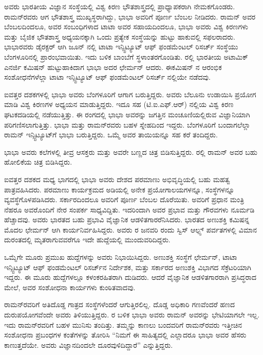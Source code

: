 ಅವರು ಭಾರತೀಯ ವಿಜ್ಞಾನ ಸಂಸ್ಥೆಯಲ್ಲಿ ವಿಶ್ವ ಕಿರಣ ಭೌತಶಾಸ್ತ್ರದಲ್ಲಿ ಪ್ರಾಧ್ಯಾಪಕರಾಗಿ ನೇಮಕಗೊಂಡರು. ರಾಮನ್‍ರವರು ಆಗ ಭೌತಶಾಸ್ತ್ರ ಮುಖ್ಯಸ್ಥರಾಗಿದ್ದು, ಭಾಭಾ ಅವರಿಗೆ ಪೂರ್ಣ ಬೆಂಬಲ ನೀಡಿದರು. ರಾಮನ್ ಅವರ ಬೆಂಬಲದಿಂದಲೂ, ಅವರ ಸಂಬಂಧಿಗಳಾದ ಟಾಟಾ ಅವರ ಸಹಾಯದಿಂದಲೂ, ಭಾಭಾ ಅವರು ವಿಶ್ವ ಕಿರಣಗಳು ಮತ್ತು ಬೈಜಿಕ ಭೌತಶಾಸ್ತ್ರ ಅಧ್ಯಯನಕ್ಕಾಗಿ ಒಂದು ಪ್ರತ್ಯೇಕ ಸಂಸ್ಥೆಯನ್ನು ಹುಟ್ಟು ಹಾಕುವಲ್ಲಿ ಸಫಲರಾದರು. ಭಾಭಾರವರು ಡೈರಕ್ಟರ್ ಆಗಿ  ಜೂನ್ ನಲ್ಲಿ ಟಾಟಾ ಇನ್ಸ್ಟಿಟ್ಯೂಟ್ ಆಫ್ ಫಂಡಮೆಂಟಲ್ ರಿಸರ್ಚ್ ಸಂಸ್ಥೆಯು ಬೆಂಗಳೂರಿನಲ್ಲಿ ಪ್ರಾರಂಭವಾಯಿತು. ಇದು ಬಳಿಕ ಬಾಂಬೆಗೆ ಸ್ಥಳಾಂತರಗೊಂಡಿತು. ರಲ್ಲಿ ಭಾರತೀಯ ಅಟಾಮಿಕ್ ಎನರ್ಜಿ ಕಮಿಷನ್ ಹುಟ್ಟುಹಾಕಿದಾಗ ಭಾಭಾ ಅದರ ಛೇರ್ಮನ್ ಆದರು. ಈ\break ಕಮಿಷನ್ ನ ಆರಂಭಿಕ ಸಂಶೋಧನೆಗಳೆಲ್ಲಾ ಟಾಟಾ ಇನ್ಸ್ಟಿಟ್ಯೂಟ್ ಆಫ್ ಫಂಡಮೆಂಟಲ್ ರಿಸರ್ಚ್ ನಲ್ಲಿಯೇ ನಡೆದವು.

ಐವತ್ತರ ದಶಕಗಳಲ್ಲಿ ಭಾಭಾ ಅವರು ಬೆಂಗಳೂರಿಗೆ ಆಗಾಗ ಬರುತ್ತಿದ್ದರು. ಅವರು ಬೆಲೂನು ಉಡಾಯಿಸಿ ಪ್ರಯೋಗ ಮಾಡಿ ವಿಶ್ವ ಕಿರಣಗಳ ಅಧ್ಯಯನ ಮಾಡುತ್ತಿದ್ದರು. ಇದೂ ಸಹ (ಟಿ.ಐ.ಎಫ್.ಆರ್) ನಲ್ಲಿಯ ವಿಶ್ವ ಕಿರಣ ಘಟಕದಡಿಯಲ್ಲಿ ನಡೆಯುತ್ತಿತ್ತು. ಈ ರಂಗದಲ್ಲಿ ಭಾಭಾ ಅವರನ್ನು ಜಗತ್ತಿನ ಮಂಚೂಣಿಯಲ್ಲಿರುವ ವಿಜ್ಞಾನಿಯಾಗಿ ಪರಿಗಣಿಸಲಾಗುತ್ತಿತ್ತು. ಭಾಭಾ ಮತ್ತು ರಾಮನ್‍ರವರು ಬಹಳ ಸ್ನೇಹದಿಂದ ಇದ್ದರು. ಬೆಂಗಳೂರಿಗೆ ಬಂದಾಗಲೆಲ್ಲಾ ರಾಮನ್ ಇನ್ಸ್ಟಿಟ್ಯೂಟ್‍ಗೆ ಭಾಭಾ ಬರುತ್ತಿದ್ದರು. ಒಮ್ಮೆ ಅವರ ತಾಯಿಯನ್ನೂ ಸಹ ಕರೆ ತಂದಿದ್ದರು.

ಭಾಭಾ ಅವರು ಕಲೆಗಳಲ್ಲಿ ತೀವ್ರ ಆಸಕ್ತರು ಮತ್ತು ಅವರೇ ಬಣ್ಣದ ಚಿತ್ರ ಬಿಡಿಸುತ್ತಿದ್ದರು. ರಲ್ಲಿ ರಾಮನ್ ಅವರ ಬಹು ಹೋಲಿಕೆಯ ಚಿತ್ರ ಬಿಡಿಸಿದ್ದರು.

ಐವತ್ತರ ದಶಕದ ಮಧ್ಯ ಭಾಗದಲ್ಲಿ ಭಾಭಾ ಅವರು ದೇಶದ ಪರಮಾಣು ಅಭಿವೃದ್ಧಿಯಲ್ಲಿ ಬಹು ಮಹತ್ವ ಪಾತ್ರವಹಿಸಿದರು. ಪರಮಾಣು ಕಾರ್ಯಕ್ರಮದ ಅಡಿಯಲ್ಲಿ ಅನೇಕ ಪ್ರಯೋಗಾಲಯಗಳನ್ನೂ, ಸಂಸ್ಥೆಗಳನ್ನೂ ವ್ಯವಸ್ಥೆಗೊಳಪಡಿಸಿದರು. ಸರ್ಕಾರದಿಂದಲೂ ಅವರಿಗೆ ಪೂರ್ಣ ಬೆಂಬಲ ದೊರೆಯಿತು. ಅವರಿಗೆ ಪ್ರಧಾನ ಮಂತ್ರಿ ನೆಹರೂ ಅವರೊಂದಿಗೆ ನೇರ ಸಂಪರ್ಕ ಸಾಧ್ಯವಿದ್ದಿತು. ಇದರಿಂದಾಗಿ ಅವರ ಪ್ರಭಾವ ಮತ್ತು ಗೌರವಗಳು ನೂರ್ಮಡಿ ಹೆಚ್ಚಾದವು. ಅವರು ಭಾರತದ ಬಹು ಪ್ರಭಾವಿ ವೈಜ್ಞಾನಿಕ ಆಡಳಿತಗಾರರೆನಿಸಿದರು. ಭಾರತದ ಅಣುಶಕ್ತಿ ಕಮಿಷನ್ನ ಮೊದಲ ಛೇರ್ಮನ್ ಆಗಿ ಕಾರ್ಯನಿರ್ವಹಿಸಿದ್ದರು. ಅವರು ರ ಜನವರಿ ರಂದು ಸ್ವಿಸ್ ಆಲ್ಪ್ಸ್ ಪರ್ವತಗಳಲ್ಲಿ ವಿಮಾನ ದುರಂತದಲ್ಲಿ ಮೃತರಾಗುವವರೆಗೂ ಇದೇ ಹುದ್ದೆಯಲ್ಲಿ ಮುಂದುವರಿದಿದ್ದರು.

ಒಮ್ಮೆಗೇ ಮೂರು ಪ್ರಮುಖ ಹುದ್ದೆಗಳನ್ನು ಅವರು ನಿಭಾಯಿಸಿದ್ದರು. ಅಣುಶಕ್ತಿ ಸಂಸ್ಥೆಗೆ ಛೇರ್ಮನ್, ಟಾಟಾ ಇನ್ಸ್ಟಿಟ್ಯೂಟ್ ಆಫ್ ಫಂಡಮೆಂಟಲ್ ರಿಸರ್ಚ್‌ನ ನಿರ್ದೇಶಕ, ಮತ್ತು ಸರ್ಕಾರದ ಅಣುಶಕ್ತಿ ವಿಭಾಗದ ಸೆಕ್ರೆಟರಿಯಾಗಿ ಇದ್ದರು. ಈ ಮೂರು ಹುದ್ದೆಗಳಲ್ಲೂ ಕಳಂಕರಹಿತರಾಗಿ ದುಡಿದರು. ಆದರೆ ವೈಜ್ಞಾನಿಕ ಆಡಳಿತಗಾರರಾಗಿ ಪ್ರಸಿದ್ಧರಾದ ಮೇಲೆ, ಅವರ ಸಂಶೋಧನಾ ಕಾರ್ಯಗಳು ಕುಂಠಿತವಾದವು.

ರಾಮನ್‍ರವರಿಗೆ ಅತಿದೊಡ್ಡ ಗಾತ್ರದ ಸಂಸ್ಥೆಗಳೆಂದರೆ ಆಗುತ್ತಿರಲಿಲ್ಲ. ದೊಡ್ಡ ಅಧಿಕಾರಿ ಗಣವೆಂದರೆ ಹಣದ ದುರುಪಯೋಗವೆಂದೇ ಅವರು ತಿಳಿಯುತ್ತಿದ್ದರು. ರ ಬಳಿಕ ಭಾಭಾ ಅವರು ರಾಮನ್ ಅವರನ್ನು ಭೇಟಿಯಾಗಲೇ ಇಲ್ಲ. ಇದು ರಾಮನ್‍ರವರಿಗೆ ಬಹಳ ಮುನಿಸು ತಂದಿತ್ತು. ತಮ್ಮನ್ನು ಕಾಣಲು ಬಂದವರಿಗೆ ರಾಮನ್‍ರವರು ಇತ್ತೀಚಿನ ಸಂಶೋಧನಾ ಪ್ರಬಂಧಗಳ ಕಂತೆಗಳನ್ನು ತೋರಿಸಿ “ನಿಮಗೆ ಈ ಸಾಹಿತ್ಯದಲ್ಲಿ ಎಲ್ಲಾದರೂ ಭಾಭಾ ಅವರ ಹೆಸರು ಕಾಣುತ್ತದೆಯೇ. ಅವರು ವಿಜ್ಞಾನದಿಂದಲೇ ದೂರವುಳಿದಿದ್ದಾರೆ” ಎನ್ನುತ್ತಿದ್ದರು.


